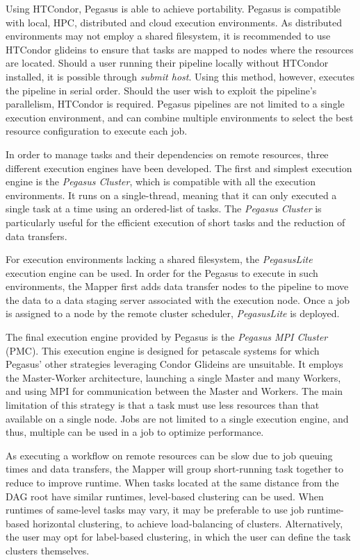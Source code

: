 \documentclass{report}
\begin{document}
        Using HTCondor, Pegasus is able to achieve portability. Pegasus is compatible with local, HPC, distributed and cloud execution environments. As distributed environments may
        not employ a shared filesystem, it is recommended to use HTCondor glideins to ensure that tasks are mapped to nodes where the resources are located. Should a user running their
        pipeline locally without HTCondor installed, it is possible through \textit{submit host}. Using this method, however, executes the pipeline in serial order. Should the user wish to exploit
        the pipeline's parallelism, HTCondor is required. Pegasus pipelines are not limited to a single execution environment, and can combine multiple environments to select the best resource
        configuration to execute each job.

        In order to manage tasks and their dependencies on remote resources, three different execution engines have been developed. The first and simplest execution engine is the 
        \textit{Pegasus Cluster}, which is 
        compatible with all the execution environments. It runs on a single-thread, meaning that it can only executed a single task at a time using an ordered-list of tasks.
        The \textit{Pegasus Cluster} is particularly useful for the efficient execution of short tasks and the reduction of data transfers. 
        
        For execution environments lacking a shared filesystem, the \textit{PegasusLite} execution engine can be used. In order for the Pegasus to execute in such environments, the Mapper first
        adds data transfer nodes to the pipeline to move the data to a data staging server associated with the execution node. Once a job is assigned to a node by the remote cluster scheduler,
        \textit{PegasusLite} is deployed.

        The final execution engine provided by Pegasus is the \textit{Pegasus MPI Cluster} (PMC). This execution engine is designed for petascale systems for which Pegasus' other strategies 
        leveraging Condor Glideins are unsuitable. It employs the Master-Worker architecture, launching a single Master and many Workers, and using MPI for communication between the 
        Master and Workers. The main limitation of this strategy is that a task must use less resources than that available on a single node. Jobs are not limited to a single execution engine,
        and thus, multiple can be used in a job to optimize performance. 
 
        As executing a workflow on remote resources can be slow due to job queuing times and data transfers, the Mapper will group short-running task together to reduce to improve runtime. 
        When tasks located at the same distance from the DAG root have similar runtimes, level-based clustering can be used. When runtimes of same-level tasks may
        vary, it may be preferable to use job runtime-based horizontal clustering, to achieve load-balancing of clusters. Alternatively, the user may opt for label-based clustering, in which
        the user can define the task clusters themselves.
\end{document}
